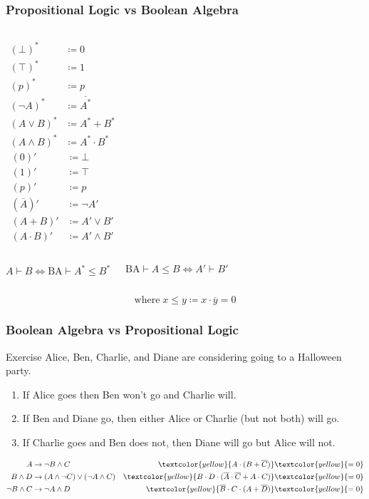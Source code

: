 \documentclass[UTF8,11pt,colorlinks,compress,openany]{beamer}%
\begin{document}
\begin{frame}\frametitle{Propositional Logic vs Boolean Algebra}
\setlength\abovedisplayskip{0pt}
\setlength\abovedisplayskip{0pt}
	\begin{columns}
			\begin{align*}
			(\bot)^*&\coloneqq 0\\
			(\top)^*&\coloneqq 1\\
			(p)^*&\coloneqq p\\
			(\neg A)^*&\coloneqq \overline{A^*}\\
			(A\vee B)^*&\coloneqq A^*+B^*\\
			(A\wedge B)^*&\coloneqq A^*\cdot B^*
			\end{align*}
			\begin{align*}
			(0)'&\coloneqq \bot\\
			(1)'&\coloneqq \top\\
			(p)'&\coloneqq p\\
			\left(\overline{A}\right)'&\coloneqq \neg A'\\
			(A+B)'&\coloneqq A'\vee B'\\
			(A\cdot B)'&\coloneqq A'\wedge B'
			\end{align*}
	\end{columns}
\begin{columns}
\begin{block}{}
	\[A\vdash B\iff\mathrm{BA}\vdash A^*\leq B^*\]
\end{block}
\begin{block}{}
	\[\mathrm{BA}\vdash A\leq B\iff A'\vdash B'\]
\end{block}
\end{columns}
	\[\text{where}\; x\leq y\coloneqq x\cdot\overline{y}=0\]
\end{frame}

\begin{frame}\frametitle{Boolean Algebra vs Propositional Logic}
	\begin{block}{Exercise}
		Alice, Ben, Charlie, and Diane are considering going to a
		Halloween party.
		\begin{enumerate}
			\item If Alice goes then Ben won't go and Charlie will.
			\item If Ben and Diane go, then either Alice or Charlie (but not both) will go.
			\item If Charlie goes and Ben does not, then Diane will go but Alice will not.
		\end{enumerate}
	\end{block}
	\begin{align*}
	A&\to\neg B\wedge C &\textcolor{yellow}{A\cdot(B+\overline{C})}&\textcolor{yellow}{=0}\\
	B\wedge D&\to(A\wedge\neg C)\vee(\neg A\wedge C) &\textcolor{yellow}{B\cdot D\cdot(\overline{A}\cdot\overline{C}+A\cdot C)}&\textcolor{yellow}{=0}\\
	\neg B\wedge C&\to\neg A\wedge D &\textcolor{yellow}{\overline{B}\cdot C\cdot(A+\overline{D})}&\textcolor{yellow}{=0}
	\end{align*}
\end{frame}
\end{document}
